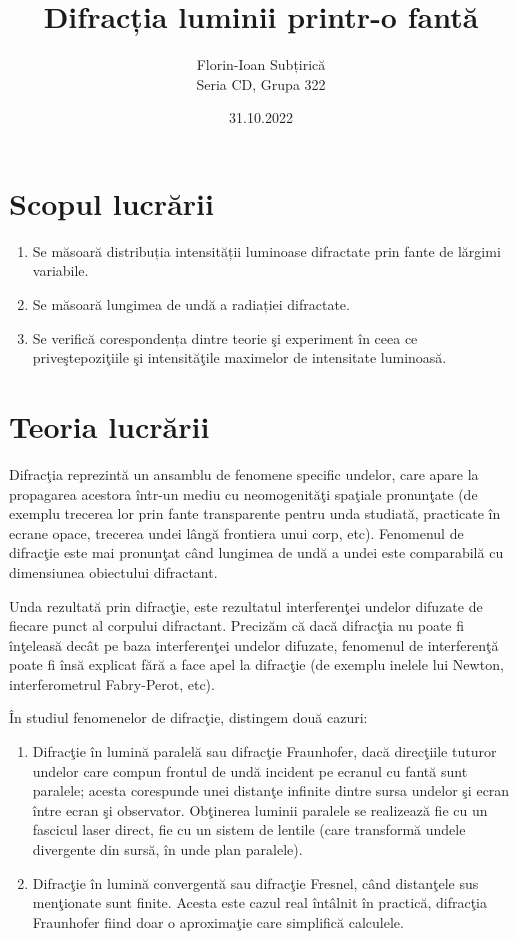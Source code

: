 \documentclass{article}
\title          {Difracția luminii printr-o fantă}
\author         {Florin-Ioan Subțirică \\ Seria CD, Grupa 322}
\date           {31.10.2022}
\begin{document}
\maketitle
\thispagestyle{empty} %
\pagebreak

\tableofcontents
\thispagestyle{empty}
\pagebreak

\section        {Scopul lucrării}

\begin{enumerate}
    \item Se măsoară distribuția intensității luminoase difractate prin fante de lărgimi variabile.
    \item Se măsoară lungimea de undă a radiației difractate.
    \item Se verifică corespondența dintre teorie şi experiment în ceea ce priveştepoziţiile şi intensităţile maximelor de intensitate luminoasă.  
\end{enumerate}

\section        {Teoria lucrării}

\makebox[1cm]{} Difracţia reprezintă un ansamblu de fenomene specific undelor, care apare la
propagarea acestora într-un mediu cu neomogenităţi spaţiale pronunţate (de exemplu trecerea
lor prin fante transparente pentru unda studiată, practicate în ecrane opace, trecerea undei
lângă frontiera unui corp, etc). Fenomenul de difracţie este mai pronunţat când lungimea de
undă a undei este comparabilă cu dimensiunea obiectului difractant.

\makebox[1cm]{} Unda rezultată prin difracţie, este rezultatul interferenţei undelor difuzate de fiecare
punct al corpului difractant. Precizăm că dacă difracţia nu poate fi înţeleasă decât pe baza
interferenţei undelor difuzate, fenomenul de interferenţă poate fi însă explicat fără a face apel
la difracţie (de exemplu inelele lui Newton, interferometrul Fabry-Perot, etc).

\makebox[1.1cm]{} În studiul fenomenelor de difracţie, distingem două cazuri:
\begin{enumerate}
    \item Difracţie în lumină paralelă sau difracţie Fraunhofer, dacă direcţiile tuturor
    undelor care compun frontul de undă incident pe ecranul cu fantă sunt paralele; acesta
    corespunde unei distanţe infinite dintre sursa undelor şi ecran între ecran şi observator.
    Obţinerea luminii paralele se realizează fie cu un fascicul laser direct, fie cu un sistem de
    lentile (care transformă undele divergente din sursă, în unde plan paralele). 
    \item Difracţie în lumină convergentă sau difracţie Fresnel, când distanţele sus
    menţionate sunt finite. Acesta este cazul real întâlnit în practică, difracţia Fraunhofer fiind
    doar o aproximaţie care simplifică calculele. 
\end{enumerate}
\end{document}
